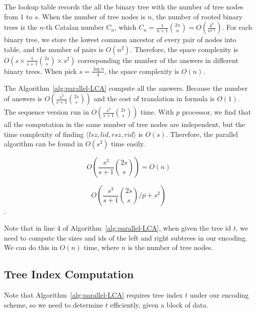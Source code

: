 
The lookup table records the all the binary tree with the number of tree
nodes from 1 to $s$.  When the number of tree nodes is $n$, the number
of rooted binary trees is the $n$-th Catalan number $C_n$, which $C_n =
\frac{1}{n+1}\binom{2n}{n} = O(\frac{4^n}{n^{1.5}})$.  For each binary
tree, we store the lowest common ancestor of every pair of nodes into
table, and the number of pairs is $O(n^2)$.  Therefore, the space
complexity is $O(s \times \frac{1}{s+1}\binom{2s}{s} \times s^2)$
corresponding the number of the answers in different binary trees.  When
pick $s = \frac{\log n}{4}$, the space complexity is $O(n)$.

The Algorithm~\ref{alg:parallel-LCA} compute all the answers.  Because
the number of answers is $O(\frac{s^3}{s+1} \binom{2s}{s})$ and the cost
of translation in formula is $O(1)$.  The sequence version run in
$O(\frac{s^3}{s+1} \binom{2s}{s})$ time.  With $p$ processor, we find
that all the computation in the same number of tree nodes are
independent, but the time complexity of finding
$\langle\mathit{lsz},\mathit{lid},\mathit{rsz},\mathit{rid}\rangle$ is
$O(s)$.  Therefore, the parallel algorithm can be found in $O(s^2)$ time
easily.

\begin{equation} \label{eq:space}
O\left(\frac{s^3}{s+1} \binom{2s}{s}\right) =
O\left(n\right)
\end{equation}

\begin{equation} \label{eq:parallel-time}
O\left(\frac{s^3}{s+1} \binom{2s}{s} \bigg/ p + s^2 \right)
\end{equation}.


Note that in line 4 of Algorithm~\ref{alg:parallel-LCA}, when given
the tree id $t$, we need to compute the sizes and ids of the left and
right subtrees in our encoding.  We can do this in $O(n)$ time, where
$n$ is the number of tree nodes.




\subsection{Tree Index Computation}

Note that Algorithm~\ref{alg:parallel-LCA} requires tree index $t$
under our encoding scheme, so we need to determine $t$ efficiently,
given a block of data.

